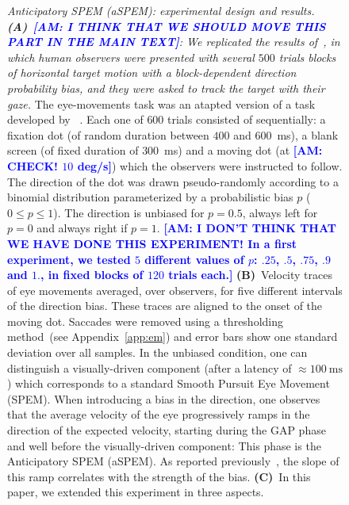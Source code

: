 \documentclass[12pt,english]{article}%
\newcommand{\ms}{\si{\milli\second}}%
\newcommand{\citep}[1]{\parencite{#1}}
\newcommand{\citet}[1]{\textcite{#1}}
\newcommand{\seeApp}[1]{Appendix~\ref{app:#1}}
\newcommand{\LP}[1]{\textbf{\textcolor{red}{[LP: #1]}}}
\newcommand{\AM}[1]{\textbf{\textcolor{blue}{[AM: #1]}}}
\begin{document}
\begin{figure}
{\caption{\emph{Anticipatory SPEM (aSPEM): experimental design and results. \textbf{(A)}~\AM{I THINK THAT WE SHOULD MOVE THIS PART IN THE MAIN TEXT}: We replicated the results of~\citet{Montagnini2010}, 
in which human observers were presented with several $500$ trials blocks of horizontal target motion with a block-dependent direction probability bias, and they were asked to track the target with their gaze.} %
The eye-movements task was an atapted version of a task developed by ~\citet{Montagnini2010}. Each one of $600$ trials consisted of sequentially:
a fixation dot (of random duration between $400$ and $600$~\ms),
a blank screen (of fixed duration of  $300$~\ms) and
a moving dot (at \AM{CHECK! $10$ deg/s}) which the observers were instructed to follow.
The direction of the dot was drawn pseudo-randomly
according to a binomial distribution
parameterized by a probabilistic bias $p$ 
($0\leq p\leq 1 $). The direction is unbiased for $p=0.5$,
always left for $p=0$ and always right if $p=1$.
\AM{I DON'T THINK THAT WE HAVE DONE THIS EXPERIMENT! In a first experiment,
we %
tested $5$ different values of $p$:
$.25$, $.5$, $.75$, $.9$ and $1.$,
in fixed blocks of $120$ trials each.}
\textbf{(B)}~Velocity traces of eye movements
averaged, over observers, for five different intervals of the direction bias.
These traces are aligned to the onset of the moving dot.
Saccades were removed using a thresholding method~(see \seeApp{em}) and
error bars show one standard deviation over all samples.
In the unbiased condition, one can distinguish
a visually-driven component (after a latency of $\approx 100~\ms$)
which corresponds to a standard Smooth Pursuit Eye Movement (SPEM).
When introducing a bias in the direction,
one observes that the average velocity of the eye progressively ramps
in the direction of the expected velocity, starting during the GAP phase and well before the visually-driven component:
This phase is the Anticipatory SPEM (aSPEM).
As reported previously~\citep{Montagnini2010, SantosKowler2017,Damasse18},
the slope of this ramp correlates with the strength of the bias.
\textbf{(C)}~In this paper, we extended this experiment in three aspects.
}}
\end{figure}
\end{document}
